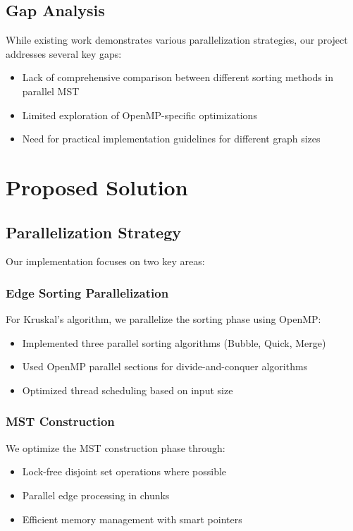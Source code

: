 \documentclass[11pt]{article}
\begin{document}
\subsection{Gap Analysis}
While existing work demonstrates various parallelization strategies, our project addresses several key gaps:
\begin{itemize}
    \item Lack of comprehensive comparison between different sorting methods in parallel MST
    \item Limited exploration of OpenMP-specific optimizations
    \item Need for practical implementation guidelines for different graph sizes
\end{itemize}

\section{Proposed Solution}
\subsection{Parallelization Strategy}
Our implementation focuses on two key areas:

\subsubsection{Edge Sorting Parallelization}
For Kruskal's algorithm, we parallelize the sorting phase using OpenMP:
\begin{itemize}
    \item Implemented three parallel sorting algorithms (Bubble, Quick, Merge)
    \item Used OpenMP parallel sections for divide-and-conquer algorithms
    \item Optimized thread scheduling based on input size
\end{itemize}

\subsubsection{MST Construction}
We optimize the MST construction phase through:
\begin{itemize}
    \item Lock-free disjoint set operations where possible
    \item Parallel edge processing in chunks
    \item Efficient memory management with smart pointers
\end{itemize}
\end{document}
